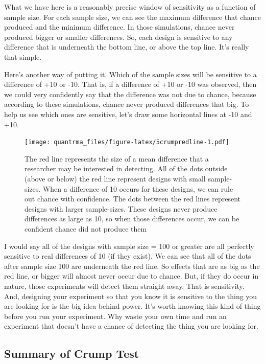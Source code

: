 \documentclass[
]{book}
\begin{document}
What we have here is a reasonably precise window of sensitivity as a function of sample size. For each sample size, we can see the maximum difference that chance produced and the minimum difference. In those simulations, chance never produced bigger or smaller differences. So, each design is sensitive to any difference that is underneath the bottom line, or above the top line. It's really that simple.

Here's another way of putting it. Which of the sample sizes will be sensitive to a difference of +10 or -10. That is, if a difference of +10 or -10 was observed, then we could very confidently say that the difference was not due to chance, because according to these simulations, chance never produced differences that big. To help us see which ones are sensitive, let's draw some horizontal lines at -10 and +10.

\begin{figure}
\centering
\texttt{[image: quantrma\_files/figure-latex/5crumpredline-1.pdf]}
\caption{\label{fig:5crumpredline}The red line represents the size of a mean difference that a researcher may be interested in detecting. All of the dots outside (above or below) the red line represent designs with small sample-sizes. When a difference of 10 occurs for these designs, we can rule out chance with confidence. The dots between the red lines represent designs with larger sample-sizes. These designs never produce differences as large as 10, so when those differences occur, we can be confident chance did not produce them}
\end{figure}

I would say all of the designs with sample size = 100 or greater are all perfectly sensitive to real differences of 10 (if they exist). We can see that all of the dots after sample size 100 are underneath the red line. So effects that are as big as the red line, or bigger will almost never occur due to chance. But, if they do occur in nature, those experiments will detect them straight away. That is sensitivity. And, designing your experiment so that you know it is sensitive to the thing you are looking for is the big idea behind power. It's worth knowing this kind of thing before you run your experiment. Why waste your own time and run an experiment that doesn't have a chance of detecting the thing you are looking for.

\hypertarget{summary-of-crump-test}{%
\subsection{Summary of Crump Test}\label{summary-of-crump-test}}
\end{document}
